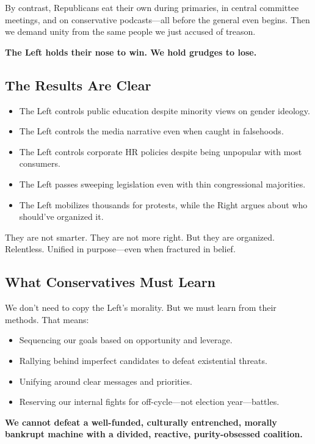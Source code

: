 By contrast, Republicans eat their own during primaries, in central committee meetings, and on conservative podcasts—all before the general even begins. Then we demand unity from the same people we just accused of treason.

\textbf{The Left holds their nose to win. We hold grudges to lose.}

\subsection*{The Results Are Clear}

\begin{itemize}
    \item The Left controls public education despite minority views on gender ideology.
    \item The Left controls the media narrative even when caught in falsehoods.
    \item The Left controls corporate HR policies despite being unpopular with most consumers.
    \item The Left passes sweeping legislation even with thin congressional majorities.
    \item The Left mobilizes thousands for protests, while the Right argues about who should’ve organized it.
\end{itemize}

They are not smarter. They are not more right. But they are organized. Relentless. Unified in purpose—even when fractured in belief.

\subsection*{What Conservatives Must Learn}

We don’t need to copy the Left’s morality. But we must learn from their methods. That means:
\begin{itemize}
    \item Sequencing our goals based on opportunity and leverage.
    \item Rallying behind imperfect candidates to defeat existential threats.
    \item Unifying around clear messages and priorities.
    \item Reserving our internal fights for off-cycle—not election year—battles.
\end{itemize}

\textbf{We cannot defeat a well-funded, culturally entrenched, morally bankrupt machine with a divided, reactive, purity-obsessed coalition.}

